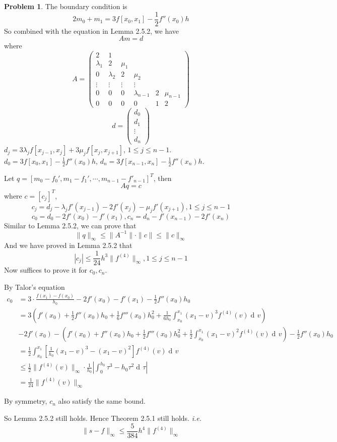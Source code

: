 \documentclass[a4paper]{article}
\theoremstyle{definition}
\newtheorem{problem}{Problem}
\theoremstyle{plain}
\newcommand{\<}{\left<}
\renewcommand{\>}{\right>}
\numberwithin{equation}{problem}
\DeclareMathOperator{\dd}{d\!}
\newcommand{\ie}{ \textit{ i.e. } }
\begin{document}
\begin{problem}
    The boundary condition is 
    \[2m_0+m_1=3f[x_0,x_1]-\frac{1}{2}f''(x_0)h\]
    So combined with the equation in Lemma 2.5.2, we have 
    \[Am=d\]
    where 
    \[A=\begin{pmatrix}
        2&1\\
        \lambda_1&2&\mu_1\\
        0&\lambda_2&2&\mu_2\\
        \vdots&\vdots&\vdots&\vdots\\
        0&0&0&\lambda_{n-1}&2&\mu_{n-1}\\
        0&0&0&0&1&2
    \end{pmatrix}\]
    \[d=\begin{pmatrix}
        d_0\\
        d_1\\
        \vdots\\
        d_{n}
    \end{pmatrix}\]
     $ d_j=3\lambda_jf[x_{j-1},x_j]+3\mu_jf[x_j,x_{j+1}] $,  $ 1 \leq j \leq n-1 $.  $ d_0=3f[x_0,x_1]-\frac{1}{2}f''(x_0)h $,  $ d_n=3f[x_{n-1},x_n]-\frac{1}{2}f''(x_n)h $.
     
    Let  $ q=[m_0-f_0',m_1-f_1',\cdots,m_{n-1}-f'_{n-1}]^T $, then 
    \[Aq=c\]
    where  $ c=[c_j]^T $, 
    \[c_j=d_j-\lambda_{j}f'(x_{j-1})-2f'(x_j)-\mu_jf'(x_{j+1}),1 \leq j \leq n-1\]
    \[c_0=d_0-2f'(x_0)-f'(x_1),c_n=d_n-f'(x_{n-1})-2f'(x_n)\]
    Similar to Lemma 2.5.2, we can prove that 
    \[\|q\|_\infty \leq \|A^{-1}\|\cdot\|c\| \leq \|c\|_\infty\]
    And we have proved in Lemma 2.5.2 that 
    \[|c_j| \leq \frac{1}{24}h^3\|f^{(4)}\|_\infty,1 \leq j \leq n-1\]
    Now suffices to prove it for  $ c_0,c_n $.

    By Talor's equation 
    \begin{align*}
        c_0&=3\cdot\frac{f(x_1)-f(x_0)}{h_0}-2f'(x_0)-f'(x_1)-\frac{1}{2}f''(x_0)h_0\\
        &=3\left(f'(x_0)+\frac{1}{2}f''(x_0)h_0+\frac{1}{6}f'''(x_0)h_0^2+\frac{1}{6h_0}\int_{x_0}^{x_1}(x_1-v)^3f^{(4)}(v)\dd v\right)\\
        &-2f'(x_0)-\left(f'(x_0)+f''(x_0)h_0+\frac{1}{2}f'''(x_0)h_0^2+\frac{1}{2}\int_{x_0}^{x_1}(x_1-v)^2f^{(4)}(v)\dd v\right)-\frac{1}{2}f''(x_0)h_0\\
        &=\frac{1}{2}\int_{x_0}^{x_1}\left[\frac{1}{h_0}(x_1-v)^3-(x_1-v)^2\right]f^{(4)}(v)\dd v\\
        & \leq \frac{1}{2}\|f^{(4)}(v)\|_\infty\cdot \frac{1}{h_0}|\int_{0}^{h_0}\tau^3-h_0\tau^2\dd\tau|\\
        & =\frac{1}{24}\|f^{(4)}(v)\|_\infty
    \end{align*}

    By symmetry,  $ c_n $ also satisfy the same bound.

    So Lemma 2.5.2 still holds. Hence Theorem 2.5.1 still holds. \ie 
    \[\|s-f\|_\infty \leq \frac{5}{384}h^4\|f^{(4)}\|_\infty\] 
\end{problem}
\end{document}
